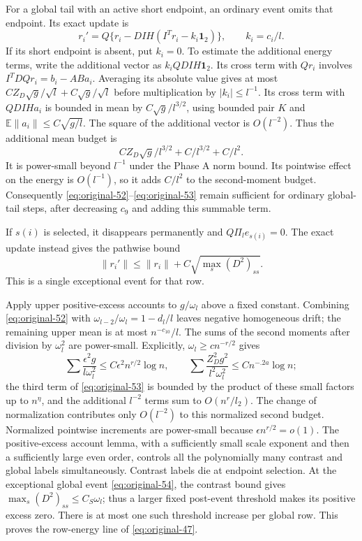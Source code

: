 For a global tail with an active short endpoint, an ordinary event
omits that endpoint.  Its exact update is
\[
 r_i'=Q\{r_i-DIH(I^Tr_i-k_i\mathbf1_2)\},\qquad k_i=c_i/l.
\]
If its short endpoint is absent, put $k_i=0$.
To estimate the additional energy terms, write the additional vector
as $k_iQDIH\mathbf1_2$.
Its cross term with $Qr_i$ involves
$I^TDQr_i=b_i-ABa_i$.
Averaging its absolute value gives at most
$C Z_D\sqrt g/\sqrt l+C\sqrt g/\sqrt l$ before multiplication
by $|k_i|\le l^{-1}$.
Its cross term with $QDIHa_i$ is bounded in mean by
$C\sqrt g/l^{3/2}$, using bounded pair $K$ and
$\mathbb E\|a_i\|\le C\sqrt{g/l}$.
The square of the additional vector is $O(l^{-2})$.
Thus the additional mean budget is
\[
 C Z_D\sqrt g/l^{3/2}+C/l^{3/2}+C/l^2.
\]
It is power-small beyond $l^{-1}$ under the Phase A norm bound.
Its pointwise effect on the energy is $O(l^{-1})$, so it adds
$C/l^2$ to the second-moment budget.  Consequently
\eqref{eq:original-52}--\eqref{eq:original-53} remain sufficient
for ordinary global-tail steps, after decreasing $c_9$ and adding
this summable term.

If $s(i)$ is selected, it disappears permanently and
$Q\Pi_le_{s(i)}=0$.  The exact update instead gives the pathwise
bound
\begin{equation}
 \|r_i'\|\le\|r_i\|+C\sqrt{\max_s(D^2)_{ss}}.
 \label{eq:original-54}
\end{equation}
This is a single exceptional event for that row.

Apply upper positive-excess accounts to $g/\omega_l$ above a fixed
constant.  Combining \eqref{eq:original-52} with
$\omega_{l-2}/\omega_l=1-d_l/l$ leaves negative homogeneous drift;
the remaining upper mean is at most $n^{-c_{10}}/l$.
The sums of the second moments after division by $\omega_l^2$
are power-small.  Explicitly, $\omega_l\ge cn^{-r/2}$ gives
\[
 \sum\frac{\epsilon^2g}{l\omega_l^2}
       \le C\epsilon^2n^{r/2}\log n,
 \qquad
 \sum\frac{Z_D^2g^2}{l^2\omega_l^2}
       \le Cn^{-.2a}\log n;
\]
the third term of \eqref{eq:original-53} is bounded by the product
of these small factors up to $n^\eta$, and the additional $l^{-2}$
terms sum to $O(n^r/l_2)$.
The change of normalization contributes only $O(l^{-2})$ to this
normalized second budget.
Normalized pointwise increments are power-small because
$\epsilon n^{r/2}=o(1)$.
The positive-excess account lemma, with a sufficiently small scale
exponent and then a sufficiently large even order, controls all the
polynomially many contrast and global labels simultaneously.
Contrast labels die at endpoint selection.  At the exceptional
global event \eqref{eq:original-54}, the contrast bound gives
$\max_s(D^2)_{ss}\le C_S\omega_l$; thus a larger fixed
post-event threshold makes its positive excess zero.
There is at most one such threshold increase per global row.
This proves the row-energy line of \eqref{eq:original-47}.

